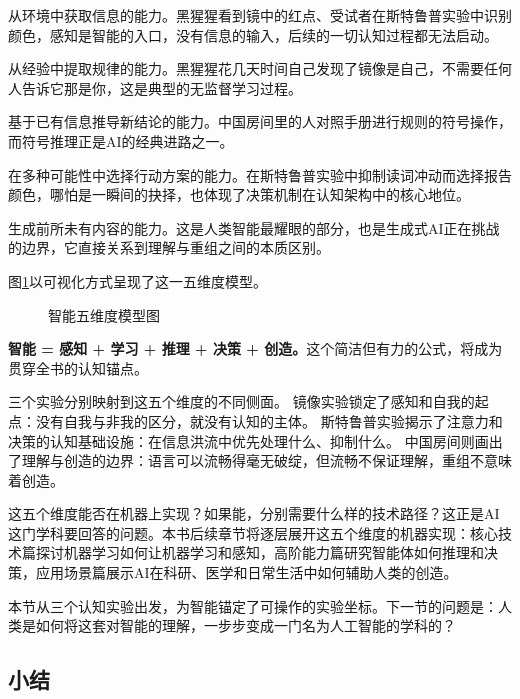 \begin{description}[font=\bfseries, leftmargin=3em, style=nextline, itemsep=2pt]
\item[感知] 从环境中获取信息的能力。黑猩猩看到镜中的红点、受试者在斯特鲁普实验中识别颜色，感知是智能的入口，没有信息的输入，后续的一切认知过程都无法启动。
\item[学习] 从经验中提取规律的能力。黑猩猩花几天时间自己发现了镜像是自己，不需要任何人告诉它那是你，这是典型的无监督学习过程。
\item[推理] 基于已有信息推导新结论的能力。中国房间里的人对照手册进行规则的符号操作，而符号推理正是AI的经典进路之一。
\item[决策] 在多种可能性中选择行动方案的能力。在斯特鲁普实验中抑制读词冲动而选择报告颜色，哪怕是一瞬间的抉择，也体现了决策机制在认知架构中的核心地位。
\item[创造] 生成前所未有内容的能力。这是人类智能最耀眼的部分，也是生成式AI正在挑战的边界，它直接关系到理解与重组之间的本质区别。
\end{description}

图\ref{fig:ch1_04}以可视化方式呈现了这一五维度模型。

\begin{figure}[htbp]
\centering
{}
\caption{智能五维度模型图}
\label{fig:ch1_04}
\end{figure}

\textbf{智能 = 感知 + 学习 + 推理 + 决策 + 创造。}这个简洁但有力的公式，将成为贯穿全书的认知锚点。

三个实验分别映射到这五个维度的不同侧面。
镜像实验锁定了感知和自我的起点：没有自我与非我的区分，就没有认知的主体。
斯特鲁普实验揭示了注意力和决策的认知基础设施：在信息洪流中优先处理什么、抑制什么。
中国房间则画出了理解与创造的边界：语言可以流畅得毫无破绽，但流畅不保证理解，重组不意味着创造。

这五个维度能否在机器上实现？如果能，分别需要什么样的技术路径？这正是AI这门学科要回答的问题。本书后续章节将逐层展开这五个维度的机器实现：核心技术篇探讨机器学习如何让机器学习和感知，高阶能力篇研究智能体如何推理和决策，应用场景篇展示AI在科研、医学和日常生活中如何辅助人类的创造。

本节从三个认知实验出发，为智能锚定了可操作的实验坐标。下一节的问题是：人类是如何将这套对智能的理解，一步步变成一门名为人工智能的学科的？

\bigskip
\subsection*{小结}

